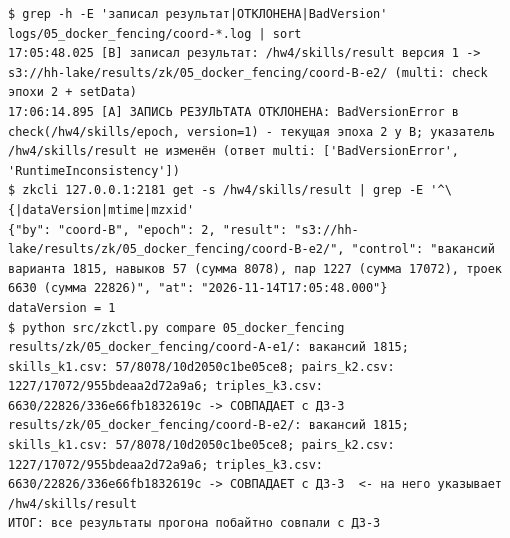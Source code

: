 \begin{Verbatim}
$ grep -h -E 'записал результат|ОТКЛОНЕНА|BadVersion' logs/05_docker_fencing/coord-*.log | sort
17:05:48.025 [B] записал результат: /hw4/skills/result версия 1 -> s3://hh-lake/results/zk/05_docker_fencing/coord-B-e2/ (multi: check эпохи 2 + setData)
17:06:14.895 [A] ЗАПИСЬ РЕЗУЛЬТАТА ОТКЛОНЕНА: BadVersionError в check(/hw4/skills/epoch, version=1) - текущая эпоха 2 у B; указатель /hw4/skills/result не изменён (ответ multi: ['BadVersionError', 'RuntimeInconsistency'])
$ zkcli 127.0.0.1:2181 get -s /hw4/skills/result | grep -E '^\{|dataVersion|mtime|mzxid'
{"by": "coord-B", "epoch": 2, "result": "s3://hh-lake/results/zk/05_docker_fencing/coord-B-e2/", "control": "вакансий варианта 1815, навыков 57 (сумма 8078), пар 1227 (сумма 17072), троек 6630 (сумма 22826)", "at": "2026-11-14T17:05:48.000"}
dataVersion = 1
$ python src/zkctl.py compare 05_docker_fencing
results/zk/05_docker_fencing/coord-A-e1/: вакансий 1815; skills_k1.csv: 57/8078/10d2050c1be05ce8; pairs_k2.csv: 1227/17072/955bdeaa2d72a9a6; triples_k3.csv: 6630/22826/336e66fb1832619c -> СОВПАДАЕТ с ДЗ-3
results/zk/05_docker_fencing/coord-B-e2/: вакансий 1815; skills_k1.csv: 57/8078/10d2050c1be05ce8; pairs_k2.csv: 1227/17072/955bdeaa2d72a9a6; triples_k3.csv: 6630/22826/336e66fb1832619c -> СОВПАДАЕТ с ДЗ-3  <- на него указывает /hw4/skills/result
ИТОГ: все результаты прогона побайтно совпали с ДЗ-3
\end{Verbatim}
